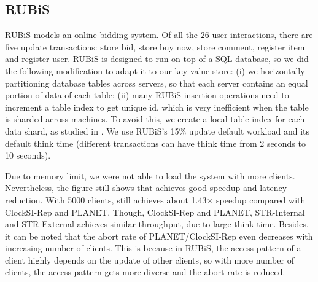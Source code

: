 \subsection{RUBiS}
RUBiS \cite{rubis} models an online bidding system. Of all the 26 user interactions, there are five update transactions: store bid, store buy now, store comment, register item and register user. RUBiS is designed to run on top of a SQL database, so we did the following modification to adapt it to our key-value store: (i) we horizontally partitioning database tables across servers, so that each server contains an equal portion of data of each table; (ii) many RUBiS insertion operations need to increment a table index to get unique id, which is very inefficient when the table is sharded across machines. To avoid this, we create a local table index for each data shard, as studied in \cite{cecchet2008middleware}. We use RUBiS's 15\% update default workload and its default think time (different transactions can have think time from 2 seconds to 10 seconds).

Due to memory limit, we were not able to load the system with more clients. Nevertheless, the figure still shows that \specula achieves good speedup and latency reduction. With 5000 clients, \specula still achieves about 1.43$\times$ speedup compared with ClockSI-Rep and PLANET. Though, ClockSI-Rep and PLANET, STR-Internal and STR-External achieves similar throughput, due to large think time. Besides, it can be noted that the abort rate of PLANET/ClockSI-Rep even decreases with increasing number of clients. This is because in RUBiS, the access pattern of a client highly depends on the update of other clients, so with more number of clients, the access pattern gets more diverse and the abort rate is reduced.


